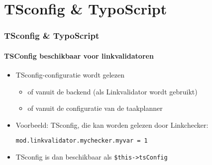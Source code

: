 %

\section{TSconfig \& TypoScript}


\begin{frame}[fragile]
	\frametitle{TSconfig \& TypoScript}
	\framesubtitle{TSConfig beschikbaar voor linkvalidatoren}

	\begin{itemize}
		\item TSconfig-configuratie wordt gelezen

			\begin{itemize}
				\item of vanuit de backend (als Linkvalidator wordt gebruikt)
				\item of vanuit de configuratie van de taakplanner
			\end{itemize}

		\item Voorbeeld: TSconfig, die kan worden gelezen door Linkchecker:

			\lstinline!mod.linkvalidator.mychecker.myvar = 1!

		\item TSconfig is dan beschikbaar als \texttt{\$this->tsConfig}
	\end{itemize}

\end{frame}



